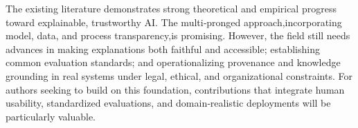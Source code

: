     

The existing literature demonstrates strong theoretical and empirical progress toward explainable, trustworthy AI. The multi‐pronged approach,incorporating model, data, and process transparency,is promising. However, the field still needs advances in making explanations both faithful and accessible; establishing common evaluation standards; and operationalizing provenance and knowledge grounding in real systems under legal, ethical, and organizational constraints.
For authors seeking to build on this foundation, contributions that integrate human usability, standardized evaluations, and domain‐realistic deployments will be particularly valuable.


